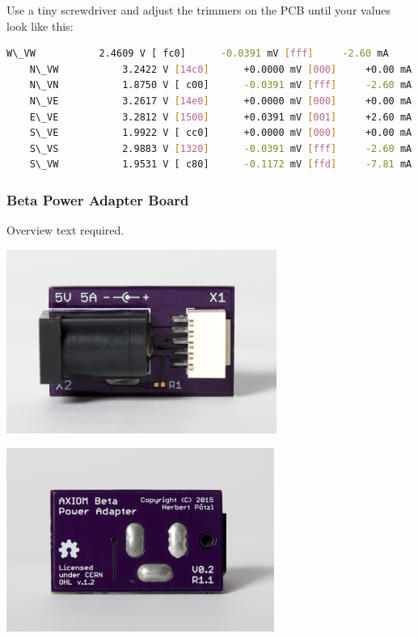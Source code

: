 Use a tiny screwdriver and adjust the trimmers on the PCB until your values look like this:

\begin{lstlisting}[language=bash,morekeywords=$,keywordstyle=\bfseries,frame=none,xleftmargin=.25in,belowskip=2em, aboveskip=2em]
    W\_VW          	2.4609 V [ fc0] 	 -0.0391 mV [fff]     -2.60 mA
    N\_VW          	3.2422 V [14c0] 	 +0.0000 mV [000]     +0.00 mA
    N\_VN          	1.8750 V [ c00] 	 -0.0391 mV [fff]     -2.60 mA
    N\_VE          	3.2617 V [14e0] 	 +0.0000 mV [000]     +0.00 mA
    E\_VE          	3.2812 V [1500] 	 +0.0391 mV [001]     +2.60 mA
    S\_VE          	1.9922 V [ cc0] 	 +0.0000 mV [000]     +0.00 mA
    S\_VS          	2.9883 V [1320] 	 -0.0391 mV [fff]     -2.60 mA
    S\_VW          	1.9531 V [ c80] 	 -0.1172 mV [ffd]     -7.81 mA
\end{lstlisting}





\subsubsection{Beta Power Adapter Board}

Overview text required.

\begin{center}
\includegraphics[height=6cm]{images/Power-adapter-02}
\end{center}

\begin{center}
\includegraphics[height=6cm]{images/Power-adapter-01}
\end{center}

